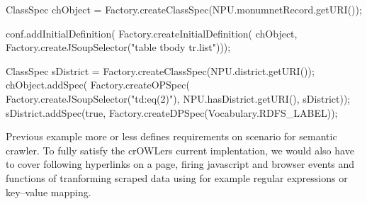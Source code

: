 \begtt
ClassSpec chObject = Factory.createClassSpec(NPU.monumnetRecord.getURI());

conf.addInitialDefinition(
       Factory.createInitialDefinition(
         chObject,
         Factory.createJSoupSelector("table tbody tr.list")));

ClassSpec sDistrict = Factory.createClassSpec(NPU.district.getURI());
chObject.addSpec(
           Factory.createOPSpec(
             Factory.createJSoupSelector("td:eq(2)"),
                                         NPU.hasDistrict.getURI(),
                                         sDistrict));
sDistrict.addSpec(true, Factory.createDPSpec(Vocabulary.RDFS_LABEL));
\endtt

Previous example more or less defines requirements on scenario for semantic
crawler. To fully satisfy the crOWLers current implentation, we would also have
to cover following hyperlinks on a page, firing javascript and browser events and
functions of tranforming scraped data using for example regular expressions or
key--value mapping. 

%


%
%
%
%





